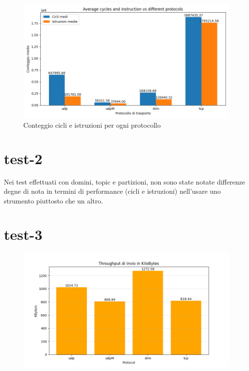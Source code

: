 \begin{figure}[H]
    \includegraphics[width=\textwidth]{./results/test1_cyclinstr.png} 
        \caption{Conteggio cicli e istruzioni per ogni protocollo}
        \label{fig:test3_different_protocols}
\end{figure}

\section{test-2}

Nei test effettuati con domini, topic e partizioni, non sono state notate differenze degne di nota in termini di performance (cicli e istruzioni) nell'usare uno strumento piuttosto che un altro. %

\section{test-3}

\begin{figure}[H]
    \includegraphics[width=\textwidth]{./results/test3_throughput.png} 
        \caption{} %
        \label{}
\end{figure}

